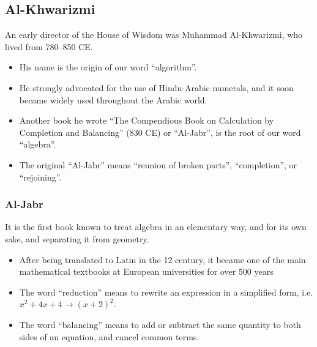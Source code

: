 \documentclass[class=article, crop=false]{standalone}
\begin{document}
  \subsection{Al-Khwarizmi}
  An early director of the House of Wisdom was Muhammad Al-Khwarizmi, who lived from 780--850 CE.
  \begin{itemize}
    \item His name is the origin of our word ``algorithm''.
    \item He strongly advocated for the use of Hindu-Arabic numerals, and it soon became widely used throughout the Arabic world.
    \item Another book he wrote ``The Compendious Book on Calculation by Completion and Balancing'' (830 CE) or ``Al-Jabr'', is the root of our word ``algebra''.
    \item The original ``Al-Jabr'' means ``reunion of broken parts'', ``completion'', or ``rejoining''.
  \end{itemize}
  \subsubsection{Al-Jabr}
  It is the first book known to treat algebra in an elementary way, and for its own sake, and separating it from geometry.
  \begin{itemize}
    \item After being translated to Latin in the 12 century, it became one of the main mathematical textbooks at European universities for over 500 years
    \item The word ``reduction'' means to rewrite an expression in a simplified form, i.e. $x^2 + 4x + 4\to (x + 2)^2$.
    \item The word ``balancing'' means to add or subtract the same quantity to both sides of an equation, and cancel common terms.
  \end{itemize}
\end{document}
